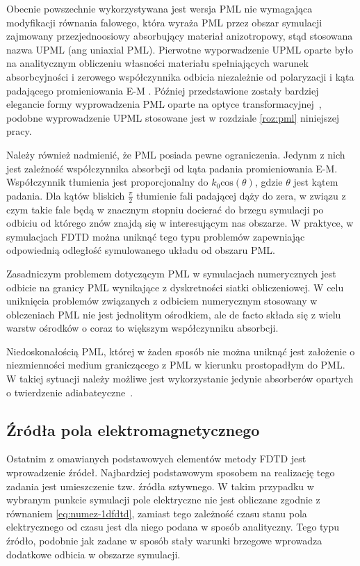 Obecnie powszechnie wykorzystywana jest wersja PML nie wymagająca modyfikacji równania falowego, która wyraża PML przez obszar symulacji zajmowany przezjednoosiowy absorbujący materiał anizotropowy, stąd stosowana nazwa UPML (ang uniaxial PML). Pierwotne wyporwadzenie UPML oparte było na analitycznym obliczeniu własności materiału spełniających warunek absorbcyjności i zerowego współczynnika odbicia niezależnie od polaryzacji i kąta padającego promieniowania E-M  \cite{sacks1995perfectly}. Później przedstawione zostały bardziej elegancie formy wyprowadzenia PML oparte na optyce transformacyjnej~\cite{rappaport1995perfectly}, podobne wyprowadzenie UPML stosowane jest w rozdziale \ref{roz:pml} niniejszej pracy.

Należy również nadmienić, że PML posiada pewne ograniczenia. Jedynm z nich jest zależność współczynnika absorbcji od kąta padania promieniowania E-M. Współczynnik tłumienia jest proporcjonalny do $k_0 \textrm{cos}(\theta)$, gdzie $\theta$ jest kątem padania. Dla kątów bliskich $\frac{\pi}{2}$ tłumienie fali padającej dąży do zera, w związu z czym takie fale będą w znacznym stopniu docierać do brzegu symulacji po odbiciu od którego znów znajdą się w interesującym nas obszarze. W praktyce, w symulacjach FDTD można uniknąć tego typu problemów zapewniając odpowiednią odległość symulowanego układu od obszaru PML.


Zasadniczym problemem dotyczącym PML w symulacjach numerycznych jest odbicie na granicy PML wynikające z dyskretności siatki obliczeniowej. W celu uniknięcia problemów związanych z odbiciem numerycznym stosowany w oblczeniach PML nie jest jednolitym ośrodkiem, ale de facto składa się z wielu warstw ośrodków o coraz to większym współczynniku absorbcji.

Niedoskonałością PML, której w żaden sposób nie można uniknąć jest założenie o niezmienności medium graniczącego z PML w kierunku prostopadłym do PML. W takiej sytuacji należy możliwe jest wykorzystanie jedynie absorberów opartych o twierdzenie adiabateyczne~\cite{oskooi2008failure}.




\subsection{Źródła pola elektromagnetycznego}
Ostatnim z omawianych podstawowych elementów metody FDTD jest wprowadzenie źródeł. Najbardziej podstawowym sposobem na realizację tego zadania jest umieszczenie tzw. źródła sztywnego. W takim przypadku w wybranym punkcie symulacji pole elektryczne nie jest obliczane zgodnie z równaniem \ref{eq:numez-1dfdtd}, zamiast tego zależność czasu stanu pola elektrycznego od czasu jest dla niego podana w sposób analityczny. Tego typu źródło, podobnie jak zadane w sposób stały warunki brzegowe wprowadza dodatkowe odbicia w obszarze symulacji.

